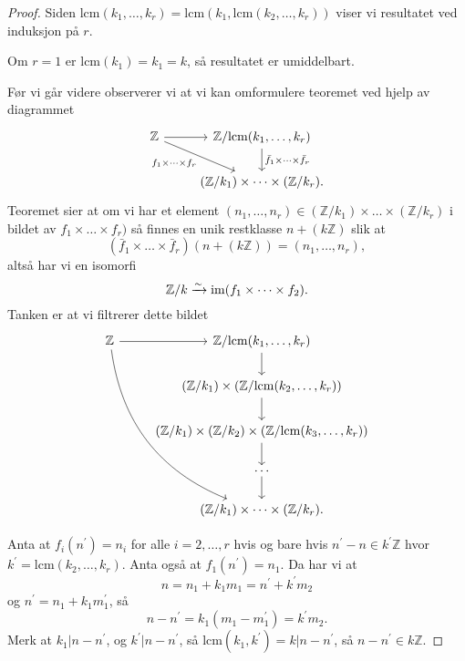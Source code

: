 \begin{proof}
    Siden
    $\mathrm{lcm}(k_1,\dots,k_r)
    = \mathrm{lcm}(k_1, \mathrm{lcm}(k_2,\dots,k_r))$
    viser vi resultatet ved induksjon på $r$.

    Om $r = 1$ er $\mathrm{lcm}(k_1) = k_1 = k$,
    så resultatet er umiddelbart.

    Før vi går videre observerer vi at vi kan omformulere teoremet
    ved hjelp av diagrammet
    \[\begin{tikzcd}
        \mathbb Z
        \rar
        \drar[swap]{f_1\times \dots\times f_r}
        &
        \mathbb Z / \mathrm{lcm}(k_1,\dots,k_r)
        \dar{\bar f_1\times\dots\times\bar f_r}
        \\
        &
        (\mathbb Z / k_1)\times \dots\times(\mathbb Z / k_r).
    \end{tikzcd}\]
    Teoremet sier at om vi har et element
    $(n_1,\dots,n_r)\in (\mathbb Z / k_1)\times\dots\times(\mathbb Z / k_r)$
    i bildet av $f_1\times\dots\times f_r)$
    så finnes en unik restklasse $n + (k\mathbb Z)$ slik at
    \[
        (\bar f_1\times\dots\times \bar f_r)(n + (k\mathbb Z)) = (n_1,\dots, n_r),
    \]
    altså har vi en isomorfi
    \[
        \mathbb Z / k\xrightarrow{\sim} \operatorname{im} (f_1\times\dots\times f_2).
    \]
    Tanken er at vi filtrerer dette bildet
    \[\begin{tikzcd}
        \mathbb Z
        \ar[bend right]{ddddr}
        \rar
        &
        \mathbb Z / \mathrm{lcm}(k_1,\dots,k_r)
        \dar
        \\
        &
        (\mathbb Z / k_1) \times (\mathbb Z / \mathrm{lcm}(k_2,\dots, k_r))
        \dar
        \\
        &
        (\mathbb Z / k_1)
        \times (\mathbb Z / k_2)
        \times (\mathbb Z / \mathrm{lcm}(k_3,\dots, k_r))
        \dar
        \\
        &
        \dots
        \dar
        \\
        &
        (\mathbb Z / k_1)
        \times\dots\times (\mathbb Z / k_r).
    \end{tikzcd}\]

    Anta at $f_i(n^\prime) = n_i$ for alle $i=2,\dots, r$ hvis og bare
    hvis $n^\prime - n\in k^\prime \mathbb Z$ hvor
    $k^\prime = \mathrm{lcm}(k_2,\dots,k_r)$.
    Anta også at $f_1(n^\prime) = n_1$.
    Da har vi at
    \[
        n = n_1 + k_1 m_1 = n^\prime + k^\prime m_2
    \]
    og $n^\prime = n_1 + k_1 m_1^\prime$,
    så
    \[
        n - n^\prime = k_1 (m_1 - m_1^\prime) = k^\prime m_2.
    \]
    Merk at $k_1 | n - n^\prime$,
    og $k^\prime | n - n^\prime$,
    så $\mathrm{lcm}(k_1, k^\prime) = k | n - n^\prime$,
    så $n - n^\prime \in k\mathbb Z$.
\end{proof}

